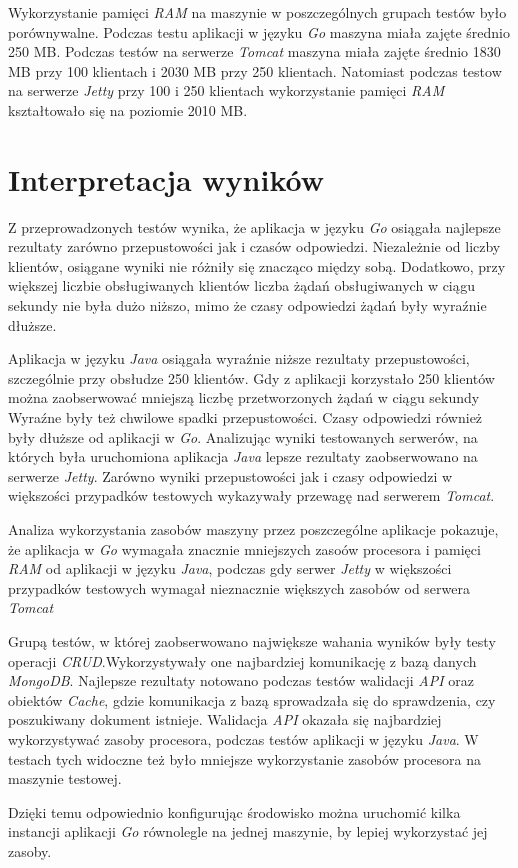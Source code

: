  Wykorzystanie pamięci \textsl{RAM} na maszynie  w poszczególnych grupach testów było porównywalne.  Podczas testu aplikacji w języku \textsl{Go} maszyna miała zajęte średnio 250 MB. Podczas testów na  serwerze \textsl{Tomcat} maszyna  miała zajęte średnio  1830 MB przy  100 klientach i 2030 MB przy 250 klientach. Natomiast podczas testow na serwerze \textsl{Jetty} przy 100 i 250 klientach wykorzystanie pamięci \textsl{RAM} kształtowało się na poziomie 2010 MB. 

% 
\clearpage

\newpage
\section{Interpretacja wyników}

Z przeprowadzonych testów wynika, że aplikacja w języku \textsl{Go} osiągała najlepsze rezultaty zarówno przepustowości jak i czasów odpowiedzi. Niezależnie od liczby klientów, osiągane wyniki nie różniły się znacząco między sobą. Dodatkowo,  przy większej liczbie obsługiwanych klientów liczba żądań obsługiwanych w ciągu sekundy nie była dużo niższo, mimo że czasy odpowiedzi żądań były wyraźnie dłuższe.

Aplikacja w języku \textsl{Java} osiągała wyraźnie niższe rezultaty przepustowości,
szczególnie przy obsłudze 250 klientów. Gdy z aplikacji korzystało 250 klientów można zaobserwować  mniejszą liczbę przetworzonych żądań w ciągu sekundy Wyraźne były też chwilowe spadki przepustowości. Czasy odpowiedzi również były dłuższe od aplikacji w \textsl{Go}. Analizując wyniki testowanych serwerów, na których była uruchomiona aplikacja \textsl{Java} lepsze rezultaty zaobserwowano na serwerze \textsl{Jetty}. Zarówno wyniki przepustowości jak i  czasy odpowiedzi w większości przypadków testowych wykazywały przewagę nad serwerem \textsl{Tomcat}. 

Analiza wykorzystania zasobów maszyny przez poszczególne aplikacje pokazuje, że aplikacja w \textsl{Go} wymagała znacznie mniejszych zasoów procesora i pamięci \textsl{RAM} od aplikacji w języku \textsl{Java}, podczas gdy serwer \textsl{Jetty} w większości przypadków testowych wymagał nieznacznie większych zasobów  od serwera \textsl{Tomcat}

Grupą testów, w której zaobserwowano największe  wahania wyników były testy operacji \textsl{CRUD}.Wykorzystywały one  najbardziej  komunikację z bazą danych \textsl{MongoDB}. Najlepsze rezultaty notowano podczas testów walidacji \textsl{API} oraz obiektów \textsl{Cache}, gdzie komunikacja z bazą sprowadzała się do sprawdzenia, czy poszukiwany dokument istnieje. Walidacja \textsl{API} okazała się najbardziej wykorzystywać zasoby procesora, podczas testów aplikacji w języku \textsl{Java}. W testach tych widoczne też było mniejsze wykorzystanie zasobów procesora na maszynie testowej.

Dzięki temu odpowiednio konfigurując środowisko można uruchomić kilka instancji aplikacji \textsl{Go} równolegle na jednej maszynie, by lepiej wykorzystać jej zasoby.